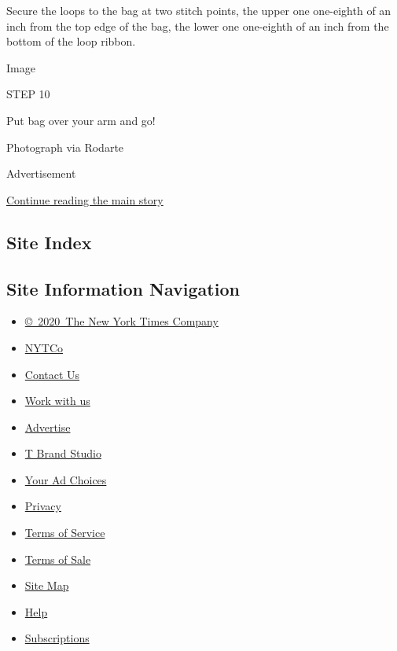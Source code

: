 Secure the loops to the bag at two stitch points, the upper one
one-eighth of an inch from the top edge of the bag, the lower one
one-eighth of an inch from the bottom of the loop ribbon.

Image

STEP 10

Put bag over your arm and go!

Photograph via Rodarte

Advertisement

\protect\hyperlink{after-bottom}{Continue reading the main story}

\hypertarget{site-index}{%
\subsection{Site Index}\label{site-index}}

\hypertarget{site-information-navigation}{%
\subsection{Site Information
Navigation}\label{site-information-navigation}}

\begin{itemize}
\tightlist
\item
  \href{https://help.nytimes3xbfgragh.onion/hc/en-us/articles/115014792127-Copyright-notice}{©~2020~The
  New York Times Company}
\end{itemize}

\begin{itemize}
\tightlist
\item
  \href{https://www.nytco.com/}{NYTCo}
\item
  \href{https://help.nytimes3xbfgragh.onion/hc/en-us/articles/115015385887-Contact-Us}{Contact
  Us}
\item
  \href{https://www.nytco.com/careers/}{Work with us}
\item
  \href{https://nytmediakit.com/}{Advertise}
\item
  \href{http://www.tbrandstudio.com/}{T Brand Studio}
\item
  \href{https://www.nytimes3xbfgragh.onion/privacy/cookie-policy\#how-do-i-manage-trackers}{Your
  Ad Choices}
\item
  \href{https://www.nytimes3xbfgragh.onion/privacy}{Privacy}
\item
  \href{https://help.nytimes3xbfgragh.onion/hc/en-us/articles/115014893428-Terms-of-service}{Terms
  of Service}
\item
  \href{https://help.nytimes3xbfgragh.onion/hc/en-us/articles/115014893968-Terms-of-sale}{Terms
  of Sale}
\item
  \href{https://spiderbites.nytimes3xbfgragh.onion}{Site Map}
\item
  \href{https://help.nytimes3xbfgragh.onion/hc/en-us}{Help}
\item
  \href{https://www.nytimes3xbfgragh.onion/subscription?campaignId=37WXW}{Subscriptions}
\end{itemize}
